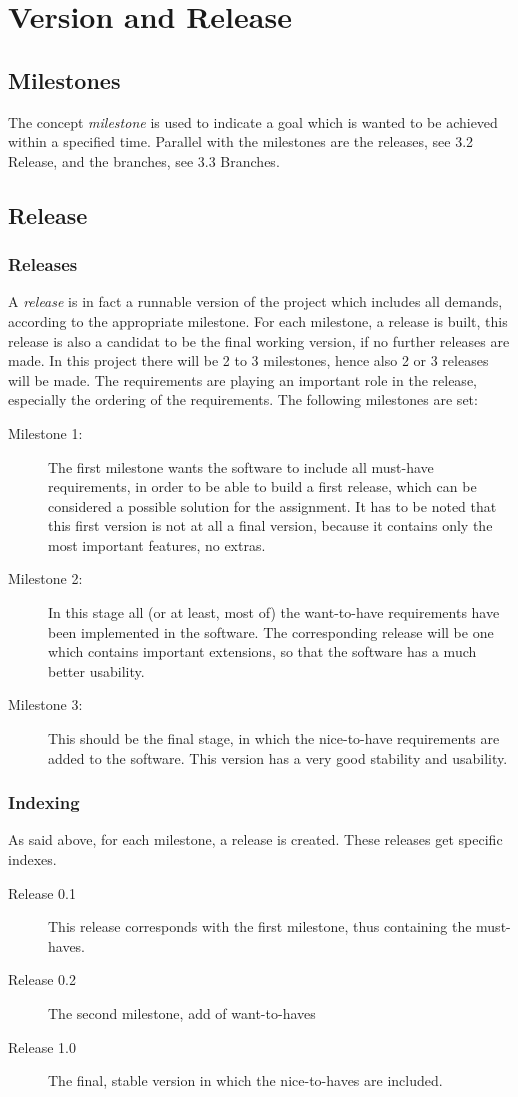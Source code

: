 \chapter{Version and Release}
\section{Milestones}
The concept {\it milestone} is used to indicate a goal which is wanted to be achieved within a specified time.
Parallel with the milestones are the releases, see 3.2 Release, and the branches, see 3.3 Branches.
\section{Release}
\subsection{Releases}
A {\it release} is in fact a runnable version of the project which includes all demands, according to the appropriate milestone.
For each milestone, a release is built, this release is also a candidat to be the final working version, if no further releases are made.
In this project there will be 2 to 3 milestones, hence also 2 or 3 releases will be made.
The requirements are playing an important role in the release, especially the ordering of the requirements.
The following milestones are set:
\begin{description}
\item[Milestone 1:]
The first milestone wants the software to include all must-have requirements, in order to be able to build a first release, which can be considered a possible solution for the assignment.
It has to be noted that this first version is not at all a final version, because it contains only the most important features, no extras.
\item[Milestone 2:]
In this stage all (or at least, most of) the want-to-have requirements have been implemented in the software.
The corresponding release will be one which contains important extensions, so that the software has a much better usability.
\item[Milestone 3:]
This should be the final stage, in which the nice-to-have requirements are added to the software. This version has a very good stability and usability.
\end{description}
\subsection{Indexing}
As said above, for each milestone, a release is created. These releases get specific indexes.
\begin{description}
\item[Release 0.1]
This release corresponds with the first milestone, thus containing the must-haves.
\item[Release 0.2]
The second milestone, add of want-to-haves
\item[Release 1.0]
The final, stable version in which the nice-to-haves are included.
\end{description}
